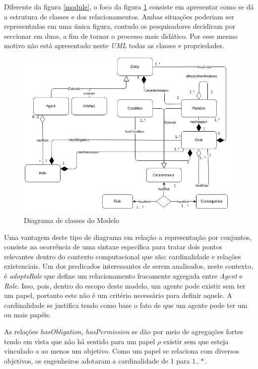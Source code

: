 Diferente da figura \ref{module}, o foco da figura \ref{classdiagrama} consiste em apresentar como se dá a estrutura de classes e dos relacionamentos. Ambas situações poderiam ser representadas em uma única figura, contudo os pesquisadores decidiram por seccionar em duas, a fim de tornar o processo mais didático. Por esse mesmo motivo não está apresentado neste \textit{UML} todas as classes e propriedades.  

\begin{figure}[H]
  \centering
  \includegraphics[width=1\linewidth]{figure/Class.png} 
  \caption{Diagrama de classes do Modelo }
  \label{classdiagrama}
\end{figure}

Uma vantagem deste tipo de diagrama em relação a representação por conjuntos, consiste na ocorrência de uma sintaxe específica para tratar dois pontos relevantes dentro do contexto computacional que são: cardinalidade e relações existenciais. Um dos predicados interessantes de serem analisados, neste contexto, é \textit{adoptsRole} que define um relacionamento fracamente agregada entre \textit{Agent} e \textit{Role}. Isso, pois, dentro do escopo deste modelo, um agente pode existir sem ter um papel, portanto este não é um critério necessário para definir aquele. A cardinalidade se justifica tendo como base o fato de que um agente pode ter um ou mais papéis. 

As relações \textit{hasObligation}, \textit{hasPermission} se dão por meio de agregações fortes tendo em vista que não há sentido para um papel $\rho$ existir sem que esteja vinculado a ao menos um objetivo. Como um papel se relaciona com diversos objetivos, os engenheiros adotaram a cardinalidade de $1$ para $1 .. *$.

